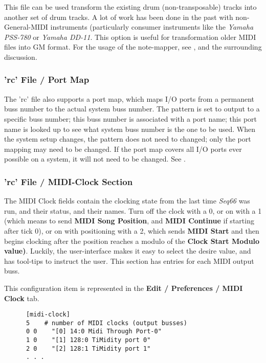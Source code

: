    This file can be used transform the existing drum (non-transposable) tracks
   into another set of drum tracks.  A lot of work has been done in the past
   with non-General-MIDI instruments (particularly consumer instruments like the
   \textsl{Yamaha PSS-780} or \textsl{Yamaha DD-11}.
   This option is useful for transformation older MIDI files into GM format.
   For the usage of the note-mapper, see
   , and the surrounding
   discussion.

\subsubsection{'rc' File / Port Map}
\label{subsubsec:configuration_rc_port_map}

   The 'rc' file also supports a port map, which maps I/O ports from a
   permanent buss number to the actual system buss number.
   The pattern is set to output to a specific buss number; this buss number is
   associated with a port name; this port name is looked up to see what
   system buss number is the one to be used.  When the system setup changes,
   the pattern does not need to changed; only the port mapping may need to be
   changed.  If the port map covers all I/O ports ever possible on a system, it
   will not need to be changed.  See .

\subsubsection{'rc' File / MIDI-Clock Section}
\label{subsec:configuration_rc_midi_clock}

   The MIDI Clock fields contain the clocking state from the last 
   time \textsl{Seq66} was run, and their status, and their names.
   Turn off the clock with a 0, or on
   with a 1 (which means to send
   \textbf{MIDI Song Position}, and
   \textbf{MIDI Continue} if
   starting after tick 0), or on with positioning with a 2, which sends
   \textbf{MIDI Start}
   and then begins clocking after the position reaches a modulo of the
   \textbf{Clock Start Modulo value)}.  Luckily, the user-interface makes it
   easy to select the desire value, and has tool-tips to instruct the user.
   This section has entries for each MIDI output buss.

   This configuration item is represented in the
   \textbf{Edit / Preferences / MIDI Clock} tab.

   \begin{verbatim}
      [midi-clock]
      5    # number of MIDI clocks (output busses)
      0 0    "[0] 14:0 Midi Through Port-0"
      1 0    "[1] 128:0 TiMidity port 0"
      2 0    "[2] 128:1 TiMidity port 1"
      . . .
   \end{verbatim}

